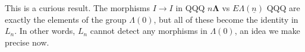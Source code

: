 \documentclass{amsbook} %
\newcommand{\ML}{\mathbf{\Lambda}}
\newcommand{\ELn}{E\Lambda(\underline{n})}
\numberwithin{section}{chapter}
\begin{document}
This is a curious result. The morphisms $I \to I$ in QQQ $n\ML$ vs $\ELn$ QQQ are exactly the elements of the group $\Lambda(0)$, but all of these become the identity in $L_n$. In other words, $L_n$ cannot detect any morphisms in $\Lambda(0)$, an idea we make precise now. 


\end{document}
